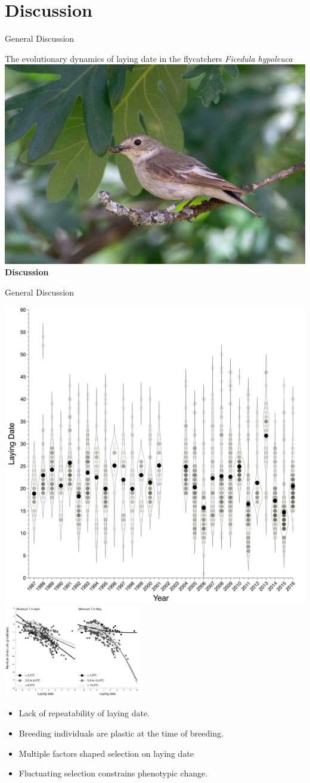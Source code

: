 \documentclass[compress]{beamer}
\begin{document}
\section{Discussion}
\begin{frame}{General Discussion}

\centering
The evolutionary dynamics of laying date in the flycatchers \textit{Ficedula hypoleuca} \\
\vspace{0.5cm}
  \includegraphics[height = 4.5 cm]{Photos/Female.jpg} \\
\textbf{Discussion}

\end{frame}

\begin{frame}{General Discussion}

 \centering
 \includegraphics[height = 4 cm]{Chapter/Layingdate.png} 
  \includegraphics[height = 4cm]{Chapter/minT.png} 
 \vspace{0.2cm}

 \raggedright
 \begin{itemize}
\item <1->Lack of repeatability of laying date. \\
\item <2->Breeding individuals are plastic at the time of breeding.\\
\item <3->Multiple factors shaped selection on laying date\\
\item <4->Fluctuating selection constrains phenotypic change.
\end{itemize}
\end{frame}
\end{document}
